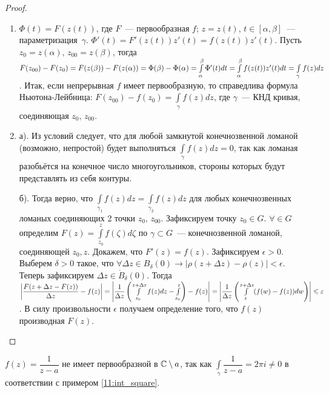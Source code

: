 \begin{proof}
    \begin{enumerate}[wide=5pt, label=\arabic*., itemsep=0ex]
        \item \(\Phi(t) = F(z(t))\), где \(F\)~--- первообразная \(f\); \(z = z(t)\), \(t \in
        [\alpha, \beta]\)~--- параметризация~\(\gamma\). \(\Phi'(t) = F'(z(t))z'(t) = f(z(t))
        z'(t)\). Пусть \(z_0 = z(\alpha), \, z_{00} = z(\beta)\), тогда \(F(z_{00}) - F(z_0) \hm=
        F(z(\beta)) - F(z(\alpha)) = \Phi(\beta) - \Phi(\alpha) = \int\limits_\alpha^\beta \Phi'(t)
        dt = \int\limits_\alpha^\beta f(z(t))z'(t)dt = \int\limits_\gamma f(z)dz\). Итак, если
        непрерывная \(f\) имеет первообразную, то справедлива формула Ньютона-Лейбница:
        \(F(z_{00}) - f(z_0) = \int\limits_\gamma f(z)dz\), где \(\gamma\)~--- КНД кривая,
        соединяющая \(z_0, \, z_{00}\).

        \item а). Из условий следует, что для любой замкнутой конечнозвенной ломаной (возможно,
        непростой) будет выполняться \(\int\limits_\gamma f(z)dz = 0\), так как ломаная разобьётся
        на конечное число многоугольников, стороны которых будут представлять из себя контуры.

        б). Тогда верно, что \(\int\limits_{\gamma_1} f(z)dz = \int\limits_{\gamma_2} f(z)dz\) для
        любых конечнозвенных ломаных соединяющих 2 точки \(z_0, \, z_{00}\). Зафиксируем точку
        \(z_0 \in G\). \(\forall \in G\) определим \(F(z) = \int\limits_{z_0}^{z} f(\zeta) d\zeta\)
        по \(\gamma \subset G\)~--- конечнозвенной ломаной, соединяющей \(z_0, z\). Докажем, что \(
        F'(z) = f(z)\). Зафиксируем \(\epsilon > 0\). Выберем \(\delta > 0\) такое, что \(\forall
        \Delta z \in B_\delta (0) \rightarrow |\rho(z+\Delta z) - \rho(z)| < \epsilon\). Теперь
        зафиксируем \(\Delta z \in \mathring{B}_\delta (0)\). Тогда \(\left|\dfrac{F(z+\Delta z -
        F(z))}{\Delta z} - f(z)\right| = \left|\dfrac{1}{\Delta z}\left(\int\limits_{z_0}^{z+\Delta
        z} f(z)dz - \int\limits_{z_0}^{z}\right) - f(z)\right| \hm= \left|\dfrac{1}{\Delta z}\left(
        \int\limits_{z}^{z+\Delta z} (f(w) - f(z))dw\right)\right| \le \epsilon\). В силу
        произвольности \(\epsilon\) получаем определение того, что \(f(z)\) производная \(F(z)\).
    \end{enumerate}
\end{proof}

\begin{example}
    \(f(z) = \dfrac{1}{z-a}\) не имеет первообразной в \(\mathbb{C} \setminus {a}\), так как \(
    \int\limits_\gamma \dfrac{1}{z-a} = 2\pi i \ne 0\) в соответствии с примером
    \ref{11:int_square}.
\end{example}


